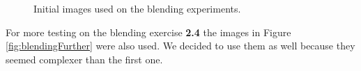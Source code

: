\documentclass[12pt,a4paper]{article}
\begin{document}
\begin{figure}[!h]
{{		}
	}
	\caption{Initial images used on the blending experiments.}
	\label{fig:blending}
\end{figure}

For more testing on the blending exercise \textbf{2.4} the images in Figure \ref{fig:blendingFurther} were also used. We decided to use them as well because they seemed complexer than the first one.

\begin{figure}[!h]
	\centering
	\quad
\end{figure}
\end{document}
